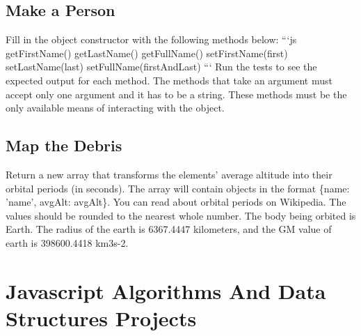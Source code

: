\documentclass{article}%
\begin{document}
\subsection{Make a Person}%
\label{subsec:MakeaPerson}%
Fill in the object constructor with the following methods below:\newline%
```js\newline%
getFirstName()\newline%
getLastName()\newline%
getFullName()\newline%
setFirstName(first)\newline%
setLastName(last)\newline%
setFullName(firstAndLast)\newline%
```\newline%
Run the tests to see the expected output for each method.\newline%
The methods that take an argument must accept only one argument and it has to be a string.\newline%
These methods must be the only available means of interacting with the object.\newline%

%
\subsection{Map the Debris}%
\label{subsec:MaptheDebris}%
Return a new array that transforms the elements' average altitude into their orbital periods (in seconds).\newline%
The array will contain objects in the format \{name: 'name', avgAlt: avgAlt\}.\newline%
You can read about orbital periods on Wikipedia.\newline%
The values should be rounded to the nearest whole number. The body being orbited is Earth.\newline%
The radius of the earth is 6367.4447 kilometers, and the GM value of earth is 398600.4418 km3s{-}2.\newline%

%
\newpage%
\section{Javascript Algorithms And Data Structures Projects}%
\label{sec:JavascriptAlgorithmsAndDataStructuresProjects}%
\end{document}
